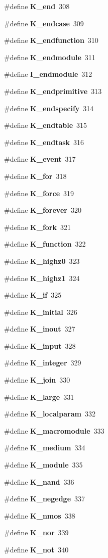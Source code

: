 \begin{CompactItemize}
\#define {\bf K\_\-end}\ 308
\item 
\#define {\bf K\_\-endcase}\ 309
\item 
\#define {\bf K\_\-endfunction}\ 310
\item 
\#define {\bf K\_\-endmodule}\ 311
\item 
\#define {\bf I\_\-endmodule}\ 312
\item 
\#define {\bf K\_\-endprimitive}\ 313
\item 
\#define {\bf K\_\-endspecify}\ 314
\item 
\#define {\bf K\_\-endtable}\ 315
\item 
\#define {\bf K\_\-endtask}\ 316
\item 
\#define {\bf K\_\-event}\ 317
\item 
\#define {\bf K\_\-for}\ 318
\item 
\#define {\bf K\_\-force}\ 319
\item 
\#define {\bf K\_\-forever}\ 320
\item 
\#define {\bf K\_\-fork}\ 321
\item 
\#define {\bf K\_\-function}\ 322
\item 
\#define {\bf K\_\-highz0}\ 323
\item 
\#define {\bf K\_\-highz1}\ 324
\item 
\#define {\bf K\_\-if}\ 325
\item 
\#define {\bf K\_\-initial}\ 326
\item 
\#define {\bf K\_\-inout}\ 327
\item 
\#define {\bf K\_\-input}\ 328
\item 
\#define {\bf K\_\-integer}\ 329
\item 
\#define {\bf K\_\-join}\ 330
\item 
\#define {\bf K\_\-large}\ 331
\item 
\#define {\bf K\_\-localparam}\ 332
\item 
\#define {\bf K\_\-macromodule}\ 333
\item 
\#define {\bf K\_\-medium}\ 334
\item 
\#define {\bf K\_\-module}\ 335
\item 
\#define {\bf K\_\-nand}\ 336
\item 
\#define {\bf K\_\-negedge}\ 337
\item 
\#define {\bf K\_\-nmos}\ 338
\item 
\#define {\bf K\_\-nor}\ 339
\item 
\#define {\bf K\_\-not}\ 340
\item 

\end{CompactItemize}
